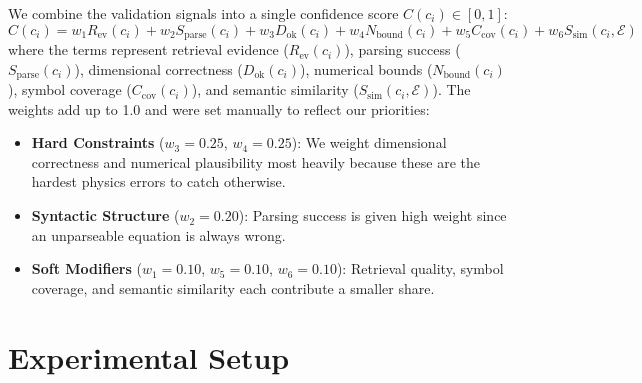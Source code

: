 \documentclass[a4paper,fleqn]{cas-sc}
\begin{document}
We combine the validation signals into a single confidence score $C(c_i) \in [0, 1]$:
\begin{equation*}
C(c_i) = w_1 R_{\mathrm{ev}}(c_i) + w_2 S_{\mathrm{parse}}(c_i) + w_3 D_{\mathrm{ok}}(c_i) + w_4 N_{\mathrm{bound}}(c_i) + w_5 C_{\mathrm{cov}}(c_i) + w_6 S_{\mathrm{sim}}(c_i, \mathcal{E})
\end{equation*}
where the terms represent retrieval evidence ($R_{\mathrm{ev}}(c_i)$), parsing success ($S_{\mathrm{parse}}(c_i)$), dimensional correctness ($D_{\mathrm{ok}}(c_i)$), numerical bounds ($N_{\mathrm{bound}}(c_i)$), symbol coverage ($C_{\mathrm{cov}}(c_i)$), and semantic similarity ($S_{\mathrm{sim}}(c_i, \mathcal{E})$). The weights add up to 1.0 and were set manually to reflect our priorities:
\begin{itemize}
    \item \textbf{Hard Constraints} ($w_3=0.25$, $w_4=0.25$): We weight dimensional correctness and numerical plausibility most heavily because these are the hardest physics errors to catch otherwise.
    \item \textbf{Syntactic Structure} ($w_2=0.20$): Parsing success is given high weight since an unparseable equation is always wrong.
    \item \textbf{Soft Modifiers} ($w_1=0.10$, $w_5=0.10$, $w_6=0.10$): Retrieval quality, symbol coverage, and semantic similarity each contribute a smaller share.
\end{itemize}

\FloatBarrier
\section{Experimental Setup}
\end{document}
